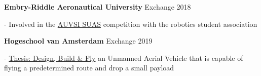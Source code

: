 \textbf{Embry-Riddle Aeronautical University} \hfill 
{\footnotesize Exchange 2018} \\
{
\raggedright
- Involved in the \href{http://www.auvsi-suas.org/}{AUVSI SUAS} competition
with the robotics student association \\
}


\textbf{Hogeschool van Amsterdam} \hfill 
{\footnotesize Exchange 2019} \\
{
\raggedright
-
\href{https://1drv.ms/b/s!AqZvnCxLmXx9hL0wv02aRwBlym0cmA?e=0Wq9fF}{Thesis: Design,
    Build \& Fly} an Unmanned Aerial Vehicle that is capable of flying a
predetermined route and drop a small payload \\
}
